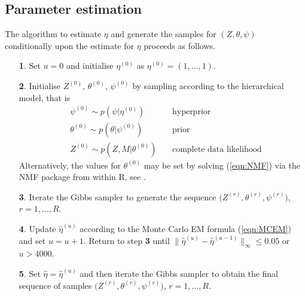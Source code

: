 \documentclass{bioinfo}
\begin{document}
\subsection{Parameter estimation}
The algorithm to estimate $\eta$ and generate the samples for $(Z,
\theta, \psi)$ conditionally upon the estimate for $\eta$ proceeds as 
follows. 
\begin{enumerate}
\item[\textbf{1}.] Set $u = 0$ and initialise $\eta^{(0)}$ as
  $\eta^{(0)} = (1, \ldots, 1)$.
\item[\textbf{2}.] Initialise $Z^{(0)}$, $\theta^{(0)}$, $\psi^{(0)}$
  by sampling according to the hierarchical model, that is
  \begin{align*}
     &\psi^{(0)} \sim p(\psi | \eta^{(0)}) &\ 
        &\text{hyperprior}\\ 
     &\theta^{(0)} \sim p(\theta | \psi^{(0)}) &\ 
        &\text{prior}\\
     &Z^{(0)} \sim p(Z, M|\theta^{(0)}) &\ 
        &\text{complete data likelihood}
  \end{align*}
  Alternatively, the values for $\theta^{(0)}$ may be set by solving 
  (\ref{eqn:NMF}) via the NMF package from within R, see
  \citealp{GS}.
\item[\textbf{3}.] Iterate the Gibbs sampler to generate the sequence
 $\big(Z^{(r)}, \theta^{(r)}, \psi^{(r)}\big)$, $r = 1, \ldots, R$.
\item[\textbf{4}.] Update $\hat\eta^{(u)}$ according to the Monte
  Carlo EM formula (\ref{eqn:MCEM}) and set $u = u+1$. Return to step
\textbf{3} until $\big\|\hat\eta^{(u)} - \hat\eta^{(u-1)}\big\|_\infty  
\leqslant 0.05$ or $u > 4000$. 
\item[\textbf{5}.] Set $\hat\eta = \hat\eta^{(u)}$ and then iterate
  the Gibbs sampler to obtain the final sequence of samples
  $\big(Z^{(r)}, \theta^{(r)}, \psi^{(r)}\big)$, $r=1, \ldots,
  R$. 
\end{enumerate}
\end{document}
